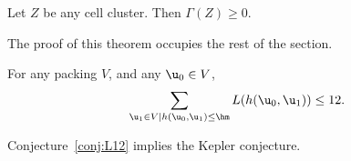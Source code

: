 \begin{theorem}\label{lemma:cluster}
Let $Z$ be any cell cluster.  Then $\Gamma(Z)\ge 0$.
\end{theorem}

The proof of this theorem occupies the rest of the section.  


\begin{conjecture}\label{conj:L12} For any packing $ V$, and
any $ \u_0\in V$,
\begin{equation}\label{eqn:L12}
\sum_{ \u_1\in V\mid h( \u_0, \u_1)\le \hm} L(h( \u_0, \u_1)) \le 12.
\end{equation}
\end{conjecture}

\begin{theorem}\label{theorem:mk2}
Conjecture~\ref{conj:L12} implies the Kepler conjecture.
\end{theorem}

